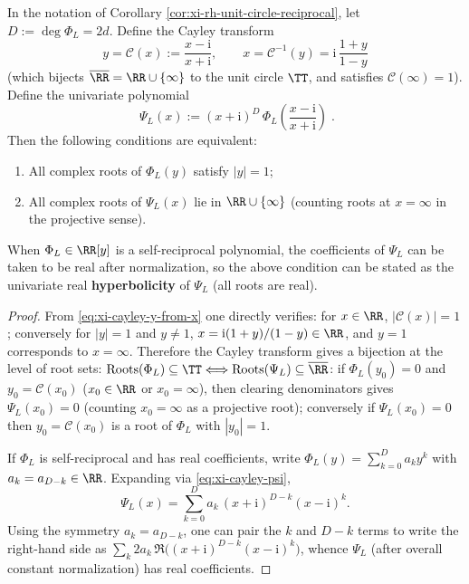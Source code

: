 \begin{proposition}\label{prop:xi-rh-cayley-hyperbolicity}
In the notation of Corollary \ref{cor:xi-rh-unit-circle-reciprocal}, let \(D:=\deg\Phi_L=2d\).
Define the Cayley transform
\begin{equation}\label{eq:xi-cayley-y-from-x}
\boxed{\;
y=\mathcal{C}(x):=\frac{x-\mathrm{i}}{x+\mathrm{i}},
\qquad
x=\mathcal{C}^{-1}(y)=\mathrm{i}\,\frac{1+y}{1-y}\;}
\end{equation}
(which bijects \(\overline{\RR}=\RR\cup\{\infty\}\) to the unit circle \(\TT\), and satisfies \(\mathcal{C}(\infty)=1\)).
Define the univariate polynomial
\begin{equation}\label{eq:xi-cayley-psi}
\boxed{\;
\Psi_L(x):=(x+\mathrm{i})^{D}\,\Phi_L\!\left(\frac{x-\mathrm{i}}{x+\mathrm{i}}\right)\; }.
\end{equation}
Then the following conditions are equivalent:
\begin{enumerate}
  \item All complex roots of \(\Phi_L(y)\) satisfy \(|y|=1\);
  \item All complex roots of \(\Psi_L(x)\) lie in \(\RR\cup\{\infty\}\) (counting roots at \(x=\infty\) in the projective sense).
\end{enumerate}
When \(\Phi_L\in\RR[y]\) is a self-reciprocal polynomial, the coefficients of \(\Psi_L\) can be taken to be real after normalization, so the above condition can be stated as the univariate real \textbf{hyperbolicity} of \(\Psi_L\) (all roots are real).
\end{proposition}
\begin{proof}
From \eqref{eq:xi-cayley-y-from-x} one directly verifies: for \(x\in\RR\), \(|\mathcal{C}(x)|=1\); conversely for \(|y|=1\) and \(y\neq 1\), \(x=\mathrm{i}(1+y)/(1-y)\in\RR\), and \(y=1\) corresponds to \(x=\infty\).
Therefore the Cayley transform gives a bijection at the level of root sets:
\(
\mathrm{Roots}(\Phi_L)\subseteq\TT
\Longleftrightarrow
\mathrm{Roots}(\Psi_L)\subseteq\overline{\RR}
\):
if \(\Phi_L(y_0)=0\) and \(y_0=\mathcal{C}(x_0)\) (\(x_0\in\RR\) or \(x_0=\infty\)), then clearing denominators gives \(\Psi_L(x_0)=0\) (counting \(x_0=\infty\) as a projective root); conversely if \(\Psi_L(x_0)=0\) then \(y_0=\mathcal{C}(x_0)\) is a root of \(\Phi_L\) with \(|y_0|=1\).
\par
If \(\Phi_L\) is self-reciprocal and has real coefficients, write \(\Phi_L(y)=\sum_{k=0}^{D}a_k y^k\) with \(a_k=a_{D-k}\in\RR\).
Expanding via \eqref{eq:xi-cayley-psi},
\[
\Psi_L(x)=\sum_{k=0}^{D} a_k\,(x+\mathrm{i})^{D-k}(x-\mathrm{i})^{k}.
\]
Using the symmetry \(a_k=a_{D-k}\), one can pair the \(k\) and \(D-k\) terms to write the right-hand side as \(\sum_k 2a_k\,\Re\bigl((x+\mathrm{i})^{D-k}(x-\mathrm{i})^{k}\bigr)\), whence \(\Psi_L\) (after overall constant normalization) has real coefficients. \qedhere
\end{proof}

